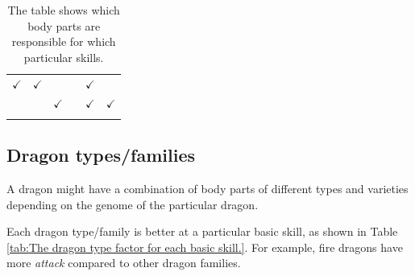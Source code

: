 \documentclass[12pt]{article}
\begin{document}
\begin{table}[!ht]
\begin{tabular}{p{0.84in}p{0.84in}p{0.84in}p{0.84in}p{0.84in}p{0.84in}}
\multicolumn{1}{p{0.84in}}{\cellcolor[HTML]{F0F0F0}\( \checkmark \)} & 
\multicolumn{1}{p{0.84in}}{\cellcolor[HTML]{F0F0F0}\( \checkmark \)} & 
\multicolumn{1}{p{0.84in}}{\cellcolor[HTML]{F0F0F0}{\fontsize{10pt}{12.0pt}\selectfont  $\times$  }} & 
\multicolumn{1}{p{0.84in}}{\cellcolor[HTML]{F0F0F0}{\fontsize{10pt}{12.0pt}\selectfont  $\times$  }} & 
\multicolumn{1}{p{0.84in}}{\cellcolor[HTML]{F0F0F0}\( \checkmark \)} \\
\hhline{~~~~~~}
\multicolumn{1}{p{0.84in}}{{\fontsize{10pt}{12.0pt}\selectfont Pattern}} & 
\multicolumn{1}{p{0.84in}}{\cellcolor[HTML]{F0F0F0}{\fontsize{10pt}{12.0pt}\selectfont  $\times$  }} & 
\multicolumn{1}{p{0.84in}}{\cellcolor[HTML]{F0F0F0}\( \checkmark \)} & 
\multicolumn{1}{p{0.84in}}{\cellcolor[HTML]{F0F0F0}{\fontsize{10pt}{12.0pt}\selectfont  $\times$  }} & 
\multicolumn{1}{p{0.84in}}{\cellcolor[HTML]{F0F0F0}\( \checkmark \)} & 
\multicolumn{1}{p{0.84in}}{\cellcolor[HTML]{F0F0F0}\( \checkmark \)} \\
\hhline{~~~~~~}

\end{tabular}\caption{The table shows which body parts are responsible for which particular skills.}
\label{tab:The table shows which body parts are responsible for which particular skills.}

 \end{table}




\subsection{Dragon types/families}
\label{Dragon types/families}  \par

A dragon might have a combination of body parts of different types and varieties depending on the genome of the particular dragon.\par

Each dragon type/family is better at a particular basic skill, as shown in  Table \ref{tab:The dragon type factor for each basic skill.}. For example, fire dragons have more \textit{attack} compared to other dragon families.\par



\end{document}
